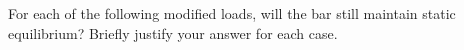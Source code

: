 \noindent For each of the following modified loads, will the bar still maintain static equilibrium?  Briefly justify your answer for each case.
  \begin{figure}[ht!]
    \centering
     \qquad
  \end{figure}
  \begin{figure}[ht!]
    \centering
     \qquad
  \end{figure}
  \begin{figure}[ht!]
    \centering
     \qquad
  \end{figure}







































